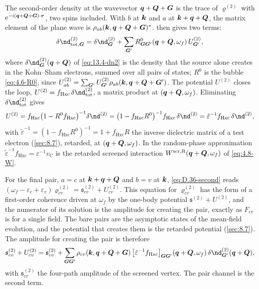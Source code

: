 The second-order density at the wavevector $\bm{q} + \bm{Q} + \bm{G}$ is the trace of $\varrho^{(2)}$ with $\mathrm{e}^{-\mathrm{i}(\bm{q}+\bm{Q}+\bm{G})\cdot\bm{r}}$, two spins included. With $b$ at $\bm{k}$ and $a$ at $\bm{k}+\bm{q}+\bm{Q}$, the matrix element of the plane wave is $\rho_{ab}(\bm{k},\bm{q}+\bm{Q}+\bm{G})^*$.  then gives two terms:
\begin{equation*}
  \delta\nd^{(2)}_{\mathrm{tot},\vect{G}} = \delta\nd^{(2)}_{\vect{G}} + \sum_{\vect{G}'}R^0_{\vect{G}\vect{G}'}(\vect{q}+\vect{Q},\omega_f)\,U^{(2)}_{\vect{G}'} ,
\end{equation*}
where $\delta\nd^{(2)}_{\vect{G}}(\vect{q}+\vect{Q})$ of \cref{eq:13.4-dn2} is the density that the source alone creates in the Kohn--Sham electrons, summed over all pairs of states; $R^0$ is the bubble \cref{eq:4.6-R0}, since $U^{(2)}_{ab} = \sum_{\bm{G}'}U^{(2)}_{\bm{G}'}\rho_{ab}(\bm{k},\bm{q}+\bm{Q}+\bm{G}')$. The potential $U^{(2)}$ closes the loop, $U^{(2)} = f_{\mathrm{Hxc}}\,\delta\nd^{(2)}_{\mathrm{tot}}$, a matrix product at $(\bm{q}+\bm{Q},\omega_f)$. Eliminating $\delta\nd^{(2)}_{\mathrm{tot}}$ gives
\begin{equation*}
  U^{(2)} = f_{\mathrm{Hxc}}\bigl(1 - R^0f_{\mathrm{Hxc}}\bigr)^{-1}\delta\nd^{(2)} = \bigl(1 - f_{\mathrm{Hxc}}R^0\bigr)^{-1}f_{\mathrm{Hxc}}\,\delta\nd^{(2)} = \tilde\varepsilon^{-1}f_{\mathrm{Hxc}}\,\delta\nd^{(2)} ,
\end{equation*}
with $\tilde\varepsilon^{-1} = (1 - f_{\mathrm{Hxc}}R^0)^{-1} = 1 + f_{\mathrm{Hxc}}R$ the inverse dielectric matrix of a test electron (\cref{sec:8.7}), retarded, at $(\bm{q}+\bm{Q},\omega_f)$. In the random-phase approximation $\tilde\varepsilon^{-1}f_{\mathrm{Hxc}} = \varepsilon^{-1}v_{\mathrm{C}}$ is the retarded screened interaction $W^{\mathrm{scr,R}}(\bm{q}+\bm{Q},\omega_f)$ of \cref{eq:4.8-W}.

For the final pair, $a = c$ at $\bm{k}+\bm{q}+\bm{Q}$ and $b = v$ at $\bm{k}$, \cref{eq:D.36-second} reads $(\omega_f - \varepsilon_c + \varepsilon_v)\varrho^{(2)}_{cv} = \mathfrak{s}^{(2)}_{cv} + U^{(2)}_{cv}$. This equation for $\varrho^{(2)}_{cv}$ has the form of a first-order coherence driven at $\omega_f$ by the one-body potential $\mathfrak{s}^{(2)} + U^{(2)}$, and the numerator of its solution is the amplitude for creating the pair, exactly as $F_{cv}$ is for a single field. The bare pairs are the asymptotic states of the mean-field evolution, and the potential that creates them is the retarded potential (\cref{sec:8.7}). The amplitude for creating the pair is therefore
\begin{equation}
  \mathfrak{s}^{(2)}_{cv} + U^{(2)}_{cv} = \mathfrak{s}^{(2)}_{cv} + \sum_{\vect{G}\vect{G}'}\rho_{cv}(\vect{k},\vect{q}+\vect{Q}+\vect{G})\,\bigl[\tilde\varepsilon^{-1}f_{\mathrm{Hxc}}\bigr]_{\vect{G}\vect{G}'}(\vect{q}+\vect{Q},\omega_f)\,\delta\nd^{(2)}_{\vect{G}'}(\vect{q}+\vect{Q}) ,
  \label{eq:D.36-amp}
\end{equation}
with $\mathfrak{s}^{(2)}_{cv}$ the four-path amplitude of the screened vertex. The pair channel is the second term.

